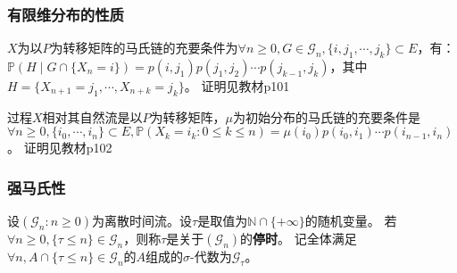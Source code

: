 \documentclass[main]{subfiles}
\begin{document}
\subsubsection{有限维分布的性质}
\begin{theorem}\label{the:4.2.5}
  \(X\)为以\(P\)为转移矩阵的马氏链的充要条件为\(\forall n \geq 0,G \in \mathcal{G}_n,\{i,j_1,\cdots,j_k\} \subset E\)，有：
  \(\mathbb{P}(H \mid G \cap \{X_n=i\})=p(i,j_1)p(j_1,j_2)\cdots p(j_{k-1},j_k)\)，其中\(H=\{X_{n+1}=j_1,\cdots,X_{n+k}=j_k\}\)。
  证明见教材p101
\end{theorem}
\begin{theorem}\label{the:4.2.7}
  过程\(X\)相对其自然流是以\(P\)为转移矩阵，\(\mu\)为初始分布的马氏链的充要条件是
  \(\forall n \geq 0,\{i_0,\cdots,i_n\} \subset E,\mathbb{P}(X_k=i_k:0 \leq k \leq n)=\mu(i_0)p(i_0,i_1)\cdots p(i_{n-1},i_n)\)。
  证明见教材p102
\end{theorem}
\subsubsection{强马氏性}
\begin{definition}\label{def:stopping_time}
  设\((\mathcal{G}_n:n \geq 0)\)为离散时间流。设\(\tau\)是取值为\(\mathbb{N} \cap \{+\infty\}\)的随机变量。
  若\(\forall n \geq 0,\{\tau \leq n\}\in \mathcal{G}_n\)，则称\(\tau\)是关于\((\mathcal{G}_n)\)的\textbf{停时}。
  记全体满足\(\forall n,A \cap \{\tau \leq n\} \in \mathcal{G}_n\)的\(A\)组成的\(\sigma\)-代数为\(\mathcal{G}_\tau\)。
\end{definition}

\ifSubfilesClassLoaded{%
  \printindex}{%
}
\end{document}
